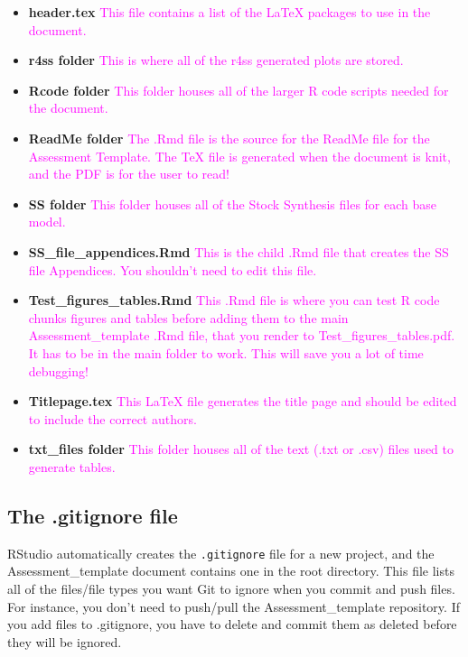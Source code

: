\documentclass[12pt,]{article}
\begin{document}
\begin{itemize}
\item
  \textbf{header.tex}
  \textcolor{magenta}{This file contains a list of the LaTeX packages to use in the document.}
\item
  \textbf{r4ss folder}
  \textcolor{magenta}{This is where all of the r4ss generated plots are stored.}
\item
  \textbf{Rcode folder}
  \textcolor{magenta}{This folder houses all of the larger R code scripts needed for the document.}
\item
  \textbf{ReadMe folder}
  \textcolor{magenta}{The .Rmd file is the source for the ReadMe file for the Assessment Template.  The TeX file is generated when the document is knit, and the PDF is for the user to read!}
\item
  \textbf{SS folder}
  \textcolor{magenta}{This folder houses all of the Stock Synthesis files for each base model.}
\item
  \textbf{SS\_file\_appendices.Rmd}
  \textcolor{magenta}{This is the child .Rmd file that creates the SS file Appendices.  You shouldn't need to edit this file.}
\item
  \textbf{Test\_figures\_tables.Rmd}
  \textcolor{magenta}{This .Rmd file is where you can test R code chunks figures and tables before adding them to the main Assessment\_template .Rmd file, that you render to Test\_figures\_tables.pdf.  It has to be in the main folder to work.  This will save you a lot of time debugging!}
\item
  \textbf{Titlepage.tex}
  \textcolor{magenta}{This LaTeX file generates the title page and should be edited to include the correct authors.}
\item
  \textbf{txt\_files folder }
  \textcolor{magenta}{This folder houses all of the text (.txt or .csv) files used to generate tables.}
\end{itemize}

\subsection{The .gitignore file}\label{the-.gitignore-file}

RStudio automatically creates the \texttt{.gitignore} file for a new
project, and the Assessment\_template document contains one in the root
directory. This file lists all of the files/file types you want Git to
ignore when you commit and push files. For instance, you don't need to
push/pull the Assessment\_template repository. If you add files to
.gitignore, you have to delete and commit them as deleted before they
will be ignored.
\end{document}
